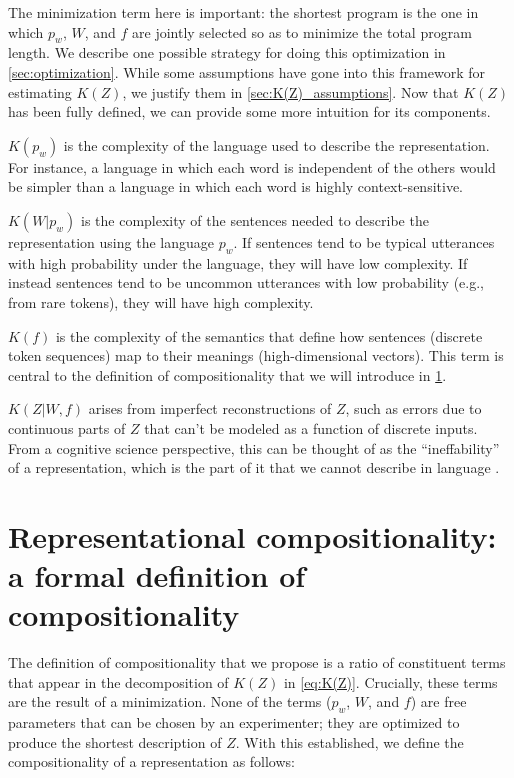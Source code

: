 \documentclass{article}
\newcommand{\Comp}{Representational compositionality}
\begin{document}
The minimization term here is important: the shortest program is the one in which $p_w$, $W$, and $f$ are jointly selected so as to minimize the total program length. We describe one possible strategy for doing this optimization in \cref{sec:optimization}. While some assumptions have gone into this framework for estimating $K(Z)$, we justify them in \cref{sec:K(Z)_assumptions}. Now that $K(Z)$ has been fully defined, we can provide some more intuition for its components.

\underline{$K(p_w)$} is the complexity of the language used to describe the representation. For instance, a language in which each word is independent of the others would be simpler than a language in which each word is highly context-sensitive.

\underline{$K(W|p_w)$} is the complexity of the sentences needed to describe the representation using the language $p_w$. If sentences tend to be typical utterances with high probability under the language, they will have low complexity. If instead sentences tend to be uncommon utterances with low probability (e.g., from rare tokens), they will have high complexity.

\underline{$K(f)$} is the complexity of the semantics that define how sentences (discrete token sequences) map to their meanings (high-dimensional vectors). This term is central to the definition of compositionality that we will introduce in \cref{sec:compositionality}.

\underline{$K(Z|W,f)$} arises from imperfect reconstructions of $Z$, such as errors due to continuous parts of $Z$ that can’t be modeled as a function of discrete inputs. From a cognitive science perspective, this can be thought of as the ``ineffability'' of a representation, which is the part of it that we cannot describe in language .


\section{\Comp{}: a formal definition of compositionality}
\label{sec:compositionality}

The definition of compositionality that we propose is a ratio of constituent terms that appear in the decomposition of $K(Z)$ in \cref{eq:K(Z)}. Crucially, these terms are the result of a minimization. None of the terms ($p_w$, $W$, and $f$) are free parameters that can be chosen by an experimenter; they are optimized to produce the shortest description of $Z$. With this established, we define the compositionality of a representation as follows:
\end{document}
